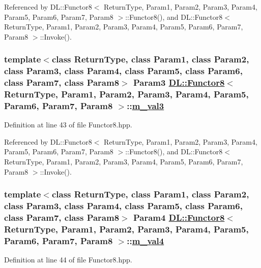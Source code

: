 Referenced by DL::Functor8$<$ Return\-Type, Param1, Param2, Param3, Param4, Param5, Param6, Param7, Param8 $>$::Functor8(), and DL::Functor8$<$ Return\-Type, Param1, Param2, Param3, Param4, Param5, Param6, Param7, Param8 $>$::Invoke().\hypertarget{classDL_1_1Functor8_r3}{
\subsubsection[m\_\-val3]{\setlength{\rightskip}{0pt plus 5cm}template$<$class Return\-Type, class Param1, class Param2, class Param3, class Param4, class Param5, class Param6, class Param7, class Param8$>$ Param3 \hyperlink{classDL_1_1Functor8}{DL::Functor8}$<$ Return\-Type, Param1, Param2, Param3, Param4, Param5, Param6, Param7, Param8 $>$::\hyperlink{classDL_1_1Functor8_r3}{m\_\-val3}}}
\label{classDL_1_1Functor8_r3}




Definition at line 43 of file Functor8.hpp.

Referenced by DL::Functor8$<$ Return\-Type, Param1, Param2, Param3, Param4, Param5, Param6, Param7, Param8 $>$::Functor8(), and DL::Functor8$<$ Return\-Type, Param1, Param2, Param3, Param4, Param5, Param6, Param7, Param8 $>$::Invoke().\hypertarget{classDL_1_1Functor8_r4}{
\subsubsection[m\_\-val4]{\setlength{\rightskip}{0pt plus 5cm}template$<$class Return\-Type, class Param1, class Param2, class Param3, class Param4, class Param5, class Param6, class Param7, class Param8$>$ Param4 \hyperlink{classDL_1_1Functor8}{DL::Functor8}$<$ Return\-Type, Param1, Param2, Param3, Param4, Param5, Param6, Param7, Param8 $>$::\hyperlink{classDL_1_1Functor8_r4}{m\_\-val4}}}
\label{classDL_1_1Functor8_r4}




Definition at line 44 of file Functor8.hpp.

